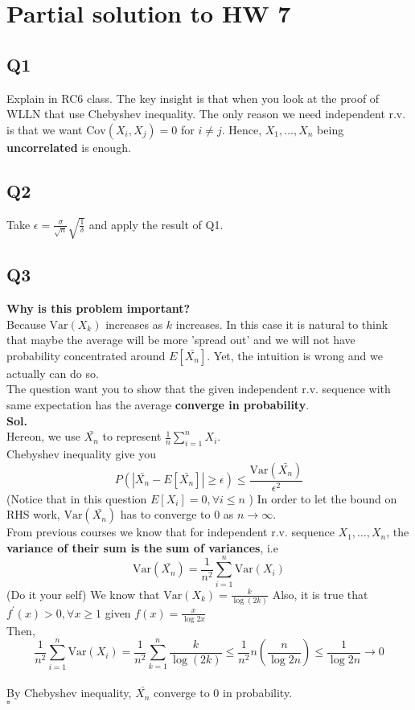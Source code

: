 \documentclass[12pt]{article}
\begin{document}
\section*{Partial solution to HW 7}
\subsection*{Q1}
Explain in RC6 class. The key insight is that when you look at the proof of WLLN that use Chebyshev inequality. 
The only reason we need independent r.v. is that we want \(\text{Cov}(X_i,X_j) = 0 \) for \(i \neq j\).  
Hence, \(X_1, \dots, X_n\) being \textbf{uncorrelated} is enough.    

\subsection*{Q2}
Take \(\epsilon  = \frac{\sigma}{\sqrt{n} } \sqrt{\frac{1}{\delta }} \) and apply the result of Q1. 

\subsection*{Q3}
\textbf{Why is this problem important?}\\
Because \(\text{Var}(X_k) \) increases as \(k\) increases. In this case it is natural to think that maybe the average will be more 'spread out' and we will not have probability concentrated around \(E[\bar{X_n}]\). 
Yet, the intuition is wrong and we actually can do so. 
\\
The question want you to show that the given independent r.v. sequence with same expectation has the average \textbf{converge in probability}.\\ 
\textbf{Sol.}\\ 
Hereon, we use \(\bar{X_n}\) to represent \(\frac{1}{n}\sum_{i=1}^{n}X_i \).\\ 
Chebyshev inequality give you 
\[
    P(|\bar{X_n} - E[\bar{X_n}]| \geq \epsilon ) \leq \frac{\text{Var}(\bar{X_n}) }{\epsilon^2}
\]
(Notice that in this question \(E[X_i] =0, \forall i \leq n  \) ) 
In order to let the bound on RHS work, \(\text{Var}(\bar{X_n}) \) has to converge to \(0\) as \(n \to \infty  \). 
\\
From previous courses we know that for independent r.v. sequence \(X_1, \dots,X_n\), the \textbf{variance of their sum is the sum of variances}, i.e 
\[
    \text{Var}(\bar{X_n}) = \frac{1}{n^2} \sum_{i=1}^{n}\text{Var}(X_i)   
\]
(Do it your self) We know that \(\text{Var}(X_k) = \frac{k}{\log{(2k)}} \)
Also, it is true that \(f^\prime (x) > 0, \forall x \geq  1\) given  \(f(x) = \frac{x}{\log{2x}}\)\\
Then, 
\[
    \frac{1}{n^2} \sum_{i=1}^{n} \text{Var}(X_i) = \frac{1}{n^2} \sum_{k=1}^{n} \frac{k}{\log{(2k)}} \leq \frac{1}{n^2} n(\frac{n}{\log{2n}}) \leq \frac{1}{\log{2n}} \to 0
\]
\\
By Chebyshev inequality, \(\bar{X_n}\) converge to 0 in probability.\\
\hspace{\textwidth}\(\square\) 
\end{document}
